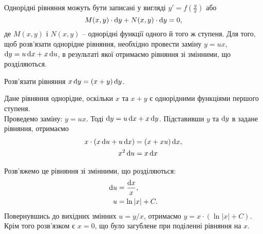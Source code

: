 Однорідні рівняння можуть бути записані у вигляді $y' = f \left( \frac{y}{x} \right)$ або 
\begin{equation*}
 	M(x, y)\cdot\mathop{}\!\mathrm{d} y + N(x, y) \cdot \mathop{}\!\mathrm{d} y = 0,
\end{equation*} де $M(x, y)$ і $N(x, y)$ -- однорідні функції одного й того ж ступеня. Для того, щоб розв’язати однорідне рівняння, необхідно провести заміну $y = u x$, $\mathop{}\!\mathrm{d} y = u \mathop{}\!\mathrm{d} x + x \mathop{}\!\mathrm{d} u$, в результаті якої отримаємо рівняння зі змінними, що розділяються. 

\begin{example}
	Розв’язати рівняння $x \mathop{}\!\mathrm{d} y = (x + y) \mathop{}\!\mathrm{d} y$. 
\end{example}

\begin{solution}
	Дане рівняння однорідне, оскільки $x$ та $x + y$ є однорідними функціями першого ступеня. \\

	Проведемо заміну: $y = u x$. Тоді $\mathop{}\!\mathrm{d} y = u \mathop{}\!\mathrm{d} x + x \mathop{}\!\mathrm{d} y$. Підставивши $y$ та $\mathop{}\!\mathrm{d} y$ в задане рівняння, отримаємо  
	\begin{align}
		\label{eq:1.42}
		x \cdot (x \mathop{}\!\mathrm{d} u + u \mathop{}\!\mathrm{d} x) &= (x + x u) \mathop{}\!\mathrm{d} x, \\
		x^2 \mathop{}\!\mathrm{d} u &= x \mathop{}\!\mathrm{d} x
	\end{align}

	Розв’яжемо це рівняння зі змінними, що розділяються:
	\begin{align}
		\label{eq:1.43}
		\mathop{}\!\mathrm{d} u &= \frac{\mathop{}\!\mathrm{d} x}{x}, \\
		u &= \ln |x| + C.
	\end{align}
	Повернувшись до вихідних змінних $u = y / x$, отримаємо $y = x \cdot (\ln |x| + C)$. Крім того розв’язком є $x = 0$, що було загублене при поділенні рівняння на $x$.
\end{solution}

